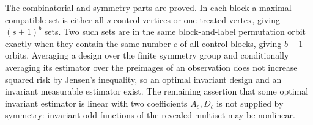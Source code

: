 The combinatorial and symmetry parts are proved.  In each block a maximal compatible set is either all \(s\) control vertices or one treated vertex, giving \((s+1)^b\) sets.  Two such sets are in the same block-and-label permutation orbit exactly when they contain the same number \(c\) of all-control blocks, giving \(b+1\) orbits.  Averaging a design over the finite symmetry group and conditionally averaging its estimator over the preimages of an observation does not increase squared risk by Jensen's inequality, so an optimal invariant design and an invariant measurable estimator exist.  The remaining assertion that some optimal invariant estimator is linear with two coefficients \(A_c,D_c\) is not supplied by symmetry: invariant odd functions of the revealed multiset may be nonlinear.
